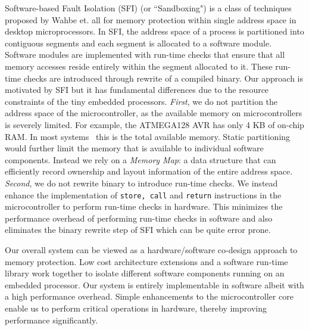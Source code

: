 Software-based Fault Isolation (SFI) (or  ``Sandboxing") is a class of techniques proposed by Wahbe et. all for memory protection within single address space in desktop microprocessors.
%
In SFI, the address space of a process is partitioned into contiguous segments and each segment is allocated to a software module.
%
Software modules are implemented with run-time checks that ensure that all memory accesses reside entirely within the segment allocated to it.
%
These run-time checks are introduced through rewrite of a compiled binary.
%
Our approach is motivated by SFI but it has fundamental differences due to the resource constraints of the tiny embedded processors.
%
\textit{First}, we do not partition the address space of the microcontroller, as the available memory on microcontrollers is severely limited.
%
For example, the ATMEGA128 AVR has only 4 KB of on-chip RAM.
%
In most systems~\cite{hill02micro} this is the total available memory.
%
Static partitioning would further limit the memory that is available to individual software components.
%
Instead we rely on a \textit{Memory Map}: a data structure that can efficiently record ownership and layout information of the entire address space.
%
\textit{Second}, we do not rewrite binary to introduce run-time checks.
%
We instead enhance the implementation of \texttt{store, call} and \texttt{return} instructions in the microcontroller to perform run-time checks in hardware.
%
This minimizes the performance overhead of performing run-time checks in software and also eliminates the binary rewrite step of SFI which can be quite error prone.


Our overall system can be viewed as a hardware/software co-design approach to memory protection.
%
Low cost architecture extensions and a software run-time library work together to isolate different software components running on an embedded processor.
%
Our system is entirely implementable in software albeit with a high performance overhead.
%
Simple enhancements to the microcontroller core enable us to perform critical operations in hardware, thereby improving performance significantly.


